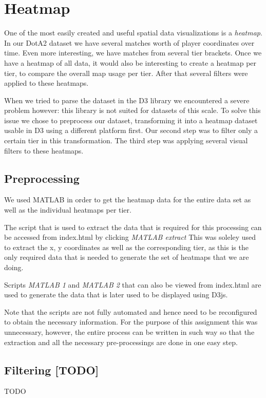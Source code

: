 \section{Heatmap}
One of the most easily created and useful spatial data visualizations is a \emph{heatmap}. In our DotA2 dataset we have several matches worth of player coordinates over time. Even more interesting, we have matches from several tier brackets. Once we have a heatmap of all data, it would also be interesting to create a heatmap per tier, to compare the overall map usage per tier. After that several filters were applied to these heatmaps.

When we tried to parse the dataset in the D3 library we encountered a severe problem however: this library is not suited for datasets of this scale. To solve this issue we chose to preprocess our dataset, transforming it into a heatmap dataset usable in D3 using a different platform first. Our second step was to filter only a certain tier in this transformation. The third step was applying several visual filters to these heatmaps.

\subsection{Preprocessing}
We used MATLAB in order to get the heatmap data for the entire data set as well as the individual heatmaps per tier.

The script that is used to extract the data that is required for this processing can be accessed from index.html by clicking \textit{MATLAB extract} This was soleley used to extract the x, y coordinates as well as the corresponding tier, as this is the only required data that is needed to generate the set of heatmaps that we are doing.

Scripts \textit{MATLAB 1} and \textit{MATLAB 2} that can also be viewed from index.html are used to generate the data that is later used to be displayed using D3js.

Note that the scripts are not fully automated and hence need to be reconfigured to obtain the necessary information. For the purpose of this assignment this was unnecessary, however, the entire process can be written in such way so that the extraction and all the necessary pre-processings are done in one easy step.

\subsection{Filtering [TODO]}
TODO

